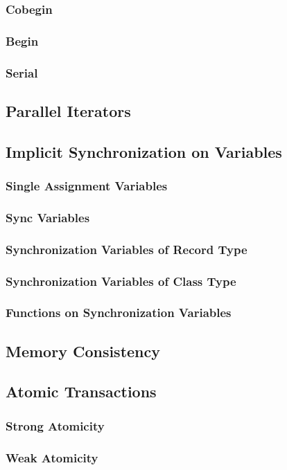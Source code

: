 \documentclass[10pt,twoside,titlepage]{article}
\begin{document}
\subsubsection{Cobegin}
\subsubsection{Begin}
\subsubsection{Serial}
\subsection{Parallel Iterators}
\subsection{Implicit Synchronization on Variables}
\subsubsection{Single Assignment Variables}
\subsubsection{Sync Variables}
\subsubsection{Synchronization Variables of Record Type}
\subsubsection{Synchronization Variables of Class Type}
\subsubsection{Functions on Synchronization Variables}
\subsection{Memory Consistency}
\subsection{Atomic Transactions}
\subsubsection{Strong Atomicity}
\subsubsection{Weak Atomicity}
\end{document}

